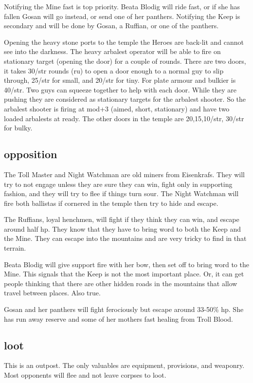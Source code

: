 Notifying the Mine fast is top priority. Beata Blodig will ride fast, or if she has fallen Gosan will go instead, or send one of her panthers. Notifying the Keep is secondary and will be done by Gosan, a Ruffian, or one of the panthers.

Opening the heavy stone ports to the temple the Heroes are back-lit and cannot see into the darkness. The heavy arbalest operator will be able to fire on stationary target (opening the door) for a couple of rounds. There are two doors, it takes 30/str rounds (ru) to open a door enough to a normal guy to slip through, 25/str for small, and 20/str for tiny. For plate armour and bulkier is 40/str. Two guys can squeeze together to help with each door. While they are pushing they are considered as stationary targets for the arbalest shooter. So the arbalest shooter is firing at mod+3 (aimed, short, stationary) and have two loaded arbalests at ready.
The other doors in the temple are 20,15,10/str, 30/str for bulky.


\subsection*{opposition}
The Toll Master and Night Watchman are old miners from Eisenkrafs. They will try to not engage unless they are sure they can win, fight only in supporting fashion, and they will try to flee if things turn sour. The Night Watchman will fire both ballistas if cornered in the temple then try to hide and escape.

The Ruffians, loyal henchmen, will fight if they think they can win, and escape around half hp. They know that they have to bring word to both the Keep and the Mine. They can escape into the mountains and are very tricky to find in that terrain.

Beata Blodig will give support fire with her bow, then set off to bring word to the Mine. This signals that the Keep is not the most important place. Or, it can get people thinking that there are other hidden roads in the mountains that allow travel between places. Also true.

Gosan and her panthers will fight ferociously but escape around 33-50\% hp. She has run away reserve and some of her mothers fast healing from Troll Blood.


\subsection*{loot}
This is an outpost. The only valuables are equipment, provisions, and weaponry. Most opponents will flee and not leave corpses to loot.









